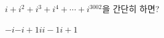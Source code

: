 $i+i^2+i^3+i^4+\cdots+i^{3002}$을 간단히 하면?
\begin{choices32}{$-i$}{$-i+1$}{$i$}{$i-1$}{$i+1$}\end{choices32}
